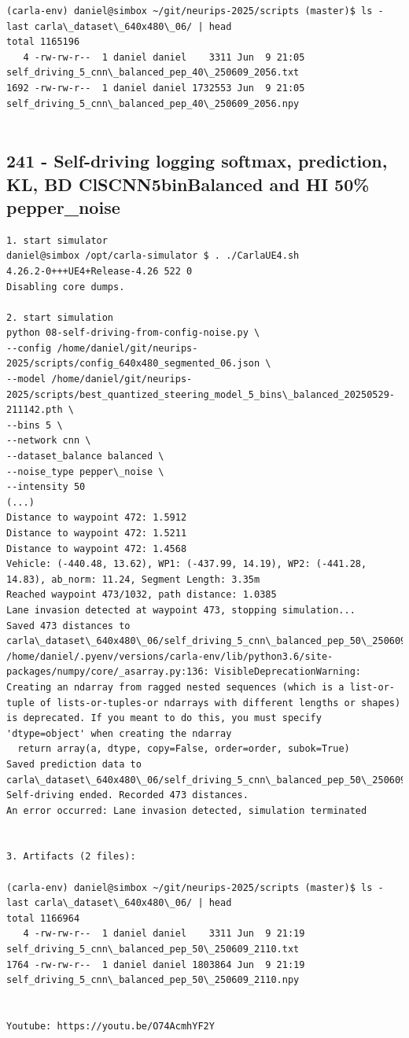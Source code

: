 \begin{verbatim}
(carla-env) daniel@simbox ~/git/neurips-2025/scripts (master)$ ls -last carla\_dataset\_640x480\_06/ | head
total 1165196
   4 -rw-rw-r--  1 daniel daniel    3311 Jun  9 21:05 self_driving_5_cnn\_balanced_pep_40\_250609_2056.txt
1692 -rw-rw-r--  1 daniel daniel 1732553 Jun  9 21:05 self_driving_5_cnn\_balanced_pep_40\_250609_2056.npy


\end{verbatim}

\subsection{241 - Self-driving logging softmax, prediction, KL, BD ClSCNN5binBalanced and HI 50\% pepper\_noise}
\label{app_res:241}

\begin{verbatim}
1. start simulator
daniel@simbox /opt/carla-simulator $ . ./CarlaUE4.sh 
4.26.2-0+++UE4+Release-4.26 522 0
Disabling core dumps.

2. start simulation
python 08-self-driving-from-config-noise.py \
--config /home/daniel/git/neurips-2025/scripts/config_640x480_segmented_06.json \
--model /home/daniel/git/neurips-2025/scripts/best_quantized_steering_model_5_bins\_balanced_20250529-211142.pth \
--bins 5 \
--network cnn \
--dataset_balance balanced \
--noise_type pepper\_noise \
--intensity 50   
(...)
Distance to waypoint 472: 1.5912
Distance to waypoint 472: 1.5211
Distance to waypoint 472: 1.4568
Vehicle: (-440.48, 13.62), WP1: (-437.99, 14.19), WP2: (-441.28, 14.83), ab_norm: 11.24, Segment Length: 3.35m
Reached waypoint 473/1032, path distance: 1.0385
Lane invasion detected at waypoint 473, stopping simulation...
Saved 473 distances to carla\_dataset\_640x480\_06/self_driving_5_cnn\_balanced_pep_50\_250609_2110.txt
/home/daniel/.pyenv/versions/carla-env/lib/python3.6/site-packages/numpy/core/_asarray.py:136: VisibleDeprecationWarning: Creating an ndarray from ragged nested sequences (which is a list-or-tuple of lists-or-tuples-or ndarrays with different lengths or shapes) is deprecated. If you meant to do this, you must specify 'dtype=object' when creating the ndarray
  return array(a, dtype, copy=False, order=order, subok=True)
Saved prediction data to carla\_dataset\_640x480\_06/self_driving_5_cnn\_balanced_pep_50\_250609_2110.npy
Self-driving ended. Recorded 473 distances.
An error occurred: Lane invasion detected, simulation terminated


3. Artifacts (2 files):

(carla-env) daniel@simbox ~/git/neurips-2025/scripts (master)$ ls -last carla\_dataset\_640x480\_06/ | head
total 1166964
   4 -rw-rw-r--  1 daniel daniel    3311 Jun  9 21:19 self_driving_5_cnn\_balanced_pep_50\_250609_2110.txt
1764 -rw-rw-r--  1 daniel daniel 1803864 Jun  9 21:19 self_driving_5_cnn\_balanced_pep_50\_250609_2110.npy


Youtube: https://youtu.be/O74AcmhYF2Y

\end{verbatim}

